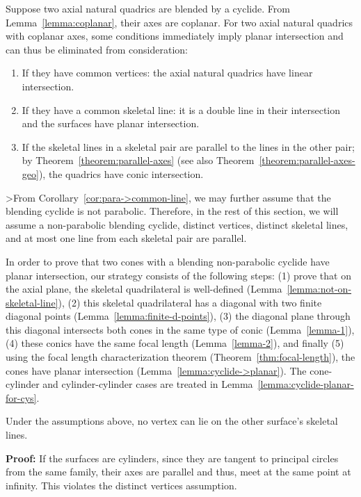     Suppose two axial natural quadrics are blended by a cyclide.  From
Lemma~\ref{lemma:coplanar}, their axes are coplanar.  For two axial natural
quadrics with coplanar axes, some conditions immediately imply planar
intersection and can thus be eliminated from consideration:
\begin{enumerate}
     \item If they have common vertices:  the axial natural quadrics
          have linear intersection.
     \item If they have a common skeletal line:  it is a double line in their 
          intersection and the surfaces have planar intersection.
     \item If the skeletal lines in a skeletal pair are parallel to the lines 
          in the other pair; by Theorem~\ref{theorem:parallel-axes}
          (see also Theorem~\ref{theorem:parallel-axes-geo}), the
          quadrics have conic intersection.
\end{enumerate}
>From Corollary~\ref{cor:para->common-line}, we may further assume that the
blending cyclide is not parabolic.  Therefore, in the rest of this section, 
we will assume a non-parabolic blending cyclide, distinct vertices, distinct 
skeletal lines, and at most one line from each skeletal pair are parallel.

     In order to prove that two cones with a blending non-parabolic cyclide
have planar intersection, our strategy consists of the following steps:
(1) prove that on the axial plane, the skeletal quadrilateral is well-defined
(Lemma~\ref{lemma:not-on-skeletal-line}),
(2) this skeletal quadrilateral has a diagonal with two finite diagonal points
(Lemma~\ref{lemma:finite-d-points}),
(3) the diagonal plane through this diagonal intersects
both cones in the same type of conic (Lemma~\ref{lemma-1}),
(4) these conics have the same focal length (Lemma~\ref{lemma-2}), 
and finally 
(5) using the focal length characterization theorem
(Theorem~\ref{thm:focal-length}), the cones have planar intersection
(Lemma~\ref{lemma:cyclide->planar}).  The cone-cylinder and cylinder-cylinder
cases are treated in Lemma~\ref{lemma:cyclide-planar-for-cys}.

\begin{lemma}
\label{lemma:not-on-skeletal-line}
     Under the assumptions above, no vertex can lie on the other surface's 
skeletal lines.
\end{lemma}
{\bf Proof:}  If the surfaces are cylinders, since they are tangent to 
principal circles from the same family, their axes are parallel and thus, meet
at the same point at infinity.  This violates the distinct vertices assumption.

